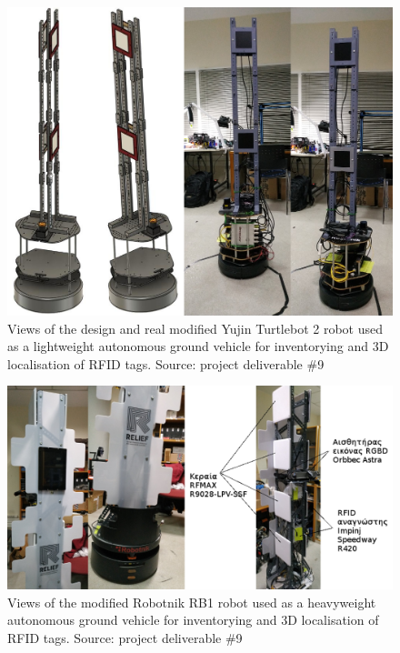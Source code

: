 \begin{figure}[H]\centering
  \includegraphics[scale=0.4]{images/relief/tb/tb_1x4.png}
  \caption{\small Views of the design and real modified Yujin Turtlebot 2 robot
           used as a lightweight autonomous ground vehicle for inventorying and
           3D localisation of RFID tags. Source: project deliverable \#9}
  \label{fig:relief_tb_1x4}
\end{figure}

\vfill

\begin{figure}[H]\centering
  \includegraphics[scale=0.4]{images/relief/rb1/rb1_1x4.png}
  \caption{\small Views of the modified Robotnik RB1 robot used as a heavyweight
           autonomous ground vehicle for inventorying and 3D localisation of
           RFID tags. Source: project deliverable \#9}
  \label{fig:relief_rb1_1x4}
\end{figure}

